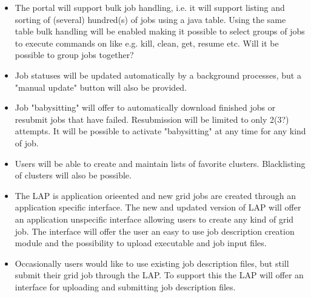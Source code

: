 \documentclass[11pt,oneside,a4paper,english]{article}
\begin{document}
\begin{itemize}
\item{The portal will support bulk job handling, i.e. it will support listing and sorting of (several) hundred(s) of jobs using a java table. Using the same table bulk handling will be enabled making it possible to select groups of jobs to execute commands on like e.g. kill, clean, get, resume etc. Will it be possible to group jobs together?}
\item{Job statuses will be updated automatically by a background processes, but a "manual update" button will also be provided.}
\item{Job "babysitting" will offer to automatically download finished jobs or resubmit jobs that have failed. Resubmission will be limited to only 2(3?) attempts. It will be possible to activate "babysitting" at any time for any kind of job.}
\item{Users will be able to create and maintain lists of favorite clusters. Blacklisting of clusters will also be possible.}
\item{The LAP is application orieented and new grid jobs are created through an application specific interface. The new and updated version of LAP will offer an application unspecific interface allowing users to create any kind of grid job. The interface will offer the user an easy to use job description creation module and the possibility to upload executable and job input files.}
\item{Occasionally users would like to use existing job description files, but still submit their grid job through the LAP. To support this the LAP will offer an interface for uploading and submitting job description files.}
\end{itemize}
\end{document}
